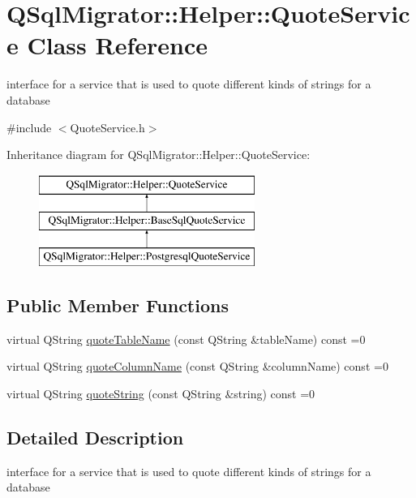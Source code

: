 \hypertarget{class_q_sql_migrator_1_1_helper_1_1_quote_service}{}\section{Q\+Sql\+Migrator\+:\+:Helper\+:\+:Quote\+Service Class Reference}
\label{class_q_sql_migrator_1_1_helper_1_1_quote_service}


interface for a service that is used to quote different kinds of strings for a database  




{\ttfamily \#include $<$Quote\+Service.\+h$>$}

Inheritance diagram for Q\+Sql\+Migrator\+:\+:Helper\+:\+:Quote\+Service\+:\begin{figure}[H]
\begin{center}
\leavevmode
\includegraphics[height=3.000000cm]{class_q_sql_migrator_1_1_helper_1_1_quote_service}
\end{center}
\end{figure}
\subsection*{Public Member Functions}
\begin{DoxyCompactItemize}
\item 
virtual Q\+String \hyperlink{class_q_sql_migrator_1_1_helper_1_1_quote_service_acb56728a4d07a8857955e34536844ec7}{quote\+Table\+Name} (const Q\+String \&table\+Name) const =0
\item 
virtual Q\+String \hyperlink{class_q_sql_migrator_1_1_helper_1_1_quote_service_ae5ed3750bb00609d483996e7baa6f885}{quote\+Column\+Name} (const Q\+String \&column\+Name) const =0
\item 
virtual Q\+String \hyperlink{class_q_sql_migrator_1_1_helper_1_1_quote_service_a5a557ef5b418afcbe9ae01ce57616218}{quote\+String} (const Q\+String \&string) const =0
\end{DoxyCompactItemize}


\subsection{Detailed Description}
interface for a service that is used to quote different kinds of strings for a database 

